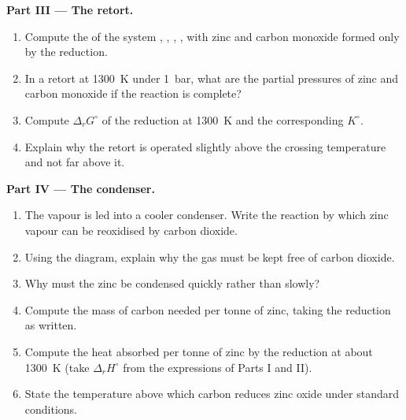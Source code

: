 \begin{problem}
\medskip
\noindent\textbf{Part III --- The retort.}
\begin{enumerate}[resume]
  \item Compute the  of the system , , ,
        , with zinc and carbon monoxide formed only by the reduction.
  \item In a retort at \qty{1300}{K} under \qty{1}{bar}, what are the partial
        pressures of zinc and carbon monoxide if the reaction is complete?
  \item Compute $\Delta_r G^\circ$ of the reduction at \qty{1300}{K} and the
        corresponding $K^\circ$.
  \item Explain why the retort is operated slightly above the crossing
        temperature and not far above it.
\end{enumerate}

\medskip
\noindent\textbf{Part IV --- The condenser.}
\begin{enumerate}[resume]
  \item The vapour is led into a cooler condenser. Write the reaction by which
        zinc vapour can be reoxidised by carbon dioxide.
  \item Using the diagram, explain why the gas must be kept free of carbon
        dioxide.
  \item Why must the zinc be condensed quickly rather than slowly?
  \item Compute the mass of carbon needed per tonne of zinc, taking the
        reduction as written.
  \item Compute the heat absorbed per tonne of zinc by the reduction at about
        \qty{1300}{K} (take $\Delta_r H^\circ$ from the expressions of Parts I
        and II).
  \item State the temperature above which carbon reduces zinc oxide under
        standard conditions.
\end{enumerate}
\end{problem}
